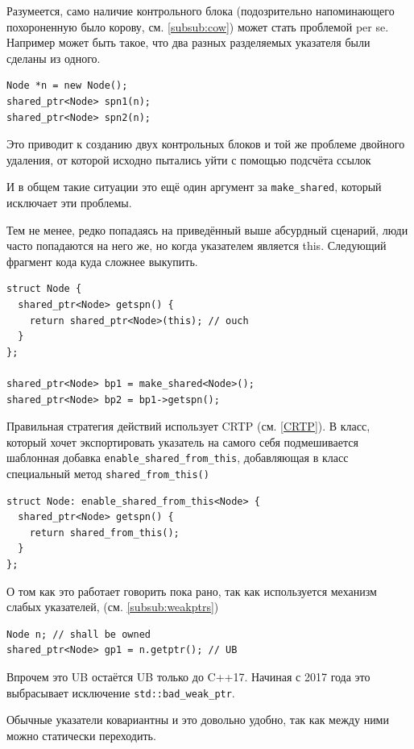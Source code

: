 \documentclass[a4paper,12pt,oneside]{article}
\begin{document}
Разумеется, само наличие контрольного блока (подозрительно напоминающего похороненную было корову, см. \ref{subsub:cow}) может стать проблемой per se. Например может быть такое, что два разных разделяемых указателя были сделаны из одного.

\begin{lstlisting}
Node *n = new Node();
shared_ptr<Node> spn1(n);
shared_ptr<Node> spn2(n);
\end{lstlisting}

Это приводит к созданию двух контрольных блоков и той же проблеме двойного удаления, от которой исходно пытались уйти с помощью подсчёта ссылок

И в общем такие ситуации это ещё один аргумент за \lstinline!make_shared!, который исключает эти проблемы.

Тем не менее, редко попадаясь на приведённый выше абсурдный сценарий, люди часто попадаются на него же, но когда указателем является this. Следующий фрагмент кода куда сложнее выкупить.

\begin{lstlisting}
struct Node {
  shared_ptr<Node> getspn() {
    return shared_ptr<Node>(this); // ouch
  }
};

shared_ptr<Node> bp1 = make_shared<Node>();
shared_ptr<Node> bp2 = bp1->getspn();
\end{lstlisting}

Правильная стратегия действий использует CRTP (см. \ref{CRTP}). В класс, который хочет экспортировать указатель на самого себя подмешивается шаблонная добавка \lstinline!enable_shared_from_this!, добавляющая в класс специальный метод \lstinline!shared_from_this()!

\begin{lstlisting}
struct Node: enable_shared_from_this<Node> {
  shared_ptr<Node> getspn() {
    return shared_from_this();
  }
};
\end{lstlisting}

О том как это работает говорить пока рано, так как используется механизм слабых указателей, (см. \ref{subsub:weakptrs})

\begin{lstlisting}
Node n; // shall be owned
shared_ptr<Node> gp1 = n.getptr(); // UB
\end{lstlisting}

Впрочем это UB остаётся UB только до C++17. Начиная с 2017 года это выбрасывает исключение \lstinline!std::bad_weak_ptr!.

Обычные указатели ковариантны и это довольно удобно, так как между ними можно статически переходить.
\end{document}
